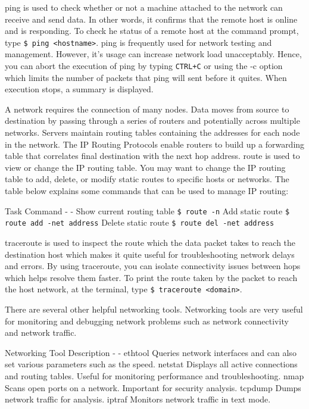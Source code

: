 ping is used to check whether or not a machine attached to the network
can receive and send data. In other words, it confirms that the remote
host is online and is responding. To check he status of a remote host at
the command prompt, type
\texttt{\$ ping \textless{}hostname\textgreater{}}. ping is frequently
used for network testing and management. However, it's usage can
increase network load unacceptably. Hence, you can abort the execution
of ping by typing \texttt{CTRL+C} or using the -c option which limits
the number of packets that ping will sent before it quites. When
execution stops, a summary is displayed.

A network requires the connection of many nodes. Data moves from source
to destination by passing through a series of routers and potentially
across multiple networks. Servers maintain routing tables containing the
addresses for each node in the network. The IP Routing Protocols enable
routers to build up a forwarding table that correlates final destination
with the next hop address. route is used to view or change the IP
routing table. You may want to change the IP routing table to add,
delete, or modify static routes to specific hosts or networks. The table
below explains some commands that can be used to manage IP routing:

Task \textbar{} Command - \textbar{} - Show current routing table
\textbar{} \texttt{\$ route -n} Add static route \textbar{}
\texttt{\$ route add -net address} Delete static route \textbar{}
\texttt{\$ route del -net address}

traceroute is used to inspect the route which the data packet takes to
reach the destination host which makes it quite useful for
troubleshooting network delays and errors. By using traceroute, you can
isolate connectivity issues between hops which helps resolve them
faster. To print the route taken by the packet to reach the host
network, at the terminal, type
\texttt{\$ traceroute \textless{}domain\textgreater{}}.

There are several other helpful networking tools. Networking tools are
very useful for monitoring and debugging network problems such as
network connectivity and network traffic.

Networking Tool \textbar{} Description - \textbar{} - ethtool \textbar{}
Queries network interfaces and can also set various parameters such as
the speed. netstat \textbar{} Displays all active connections and
routing tables. Useful for monitoring performance and troubleshooting.
nmap \textbar{} Scans open ports on a network. Important for security
analysis. tcpdump \textbar{} Dumps network traffic for analysis. iptraf
\textbar{} Monitors network traffic in text mode.

